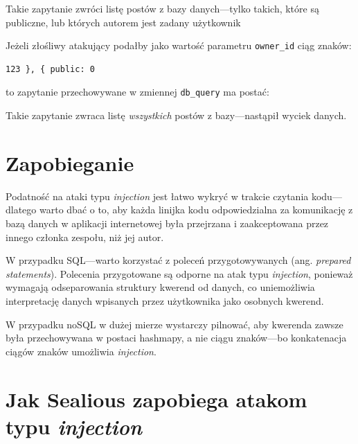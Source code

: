 \documentclass[12pt,polish,a4paper,]{report}
\newenvironment{Shaded}{}{}
\newcommand{\DataTypeTok}[1]{\textcolor[rgb]{0.56,0.13,0.00}{{#1}}}
\newcommand{\DecValTok}[1]{\textcolor[rgb]{0.25,0.63,0.44}{{#1}}}
\newcommand{\OtherTok}[1]{\textcolor[rgb]{0.00,0.44,0.13}{{#1}}}
\newcommand{\FunctionTok}[1]{\textcolor[rgb]{0.02,0.16,0.49}{{#1}}}
\begin{document}
Takie zapytanie zwróci listę postów z bazy danych---tylko takich, które
są publiczne, lub których autorem jest zadany użytkownik

Jeżeli złośliwy atakujący podałby jako wartość parametru
\texttt{owner\_id} ciąg znaków:

\begin{verbatim}
123 }, { public: 0
\end{verbatim}

to zapytanie przechowywane w zmiennej \texttt{db\_query} ma postać:

\begin{Shaded}
\end{Shaded}

Takie zapytanie zwraca listę \emph{wszystkich} postów z bazy---nastąpił
wyciek danych.

\section{Zapobieganie}\label{zapobieganie}

Podatność na ataki typu \emph{injection} jest łatwo wykryć w trakcie
czytania kodu---dlatego warto dbać o to, aby każda linijka kodu
odpowiedzialna za komunikację z bazą danych w aplikacji internetowej
była przejrzana i zaakceptowana przez innego członka zespołu, niż jej
autor.

W przypadku SQL---warto korzystać z poleceń przygotowywanych (ang.
\emph{prepared statements}). Polecenia przygotowane są odporne na atak
typu \emph{injection}, ponieważ wymagają odseparowania struktury kwerend
od danych, co uniemożliwia interpretację danych wpisanych przez
użytkownika jako osobnych kwerend.

W przypadku noSQL w dużej mierze wystarczy pilnować, aby kwerenda zawsze
była przechowywana w postaci hashmapy, a nie ciągu znaków---bo
konkatenacja ciągów znaków umożliwia \emph{injection}.

\section{\texorpdfstring{Jak Sealious zapobiega atakom typu
\emph{injection}}{Jak Sealious zapobiega atakom typu injection}}\label{jak-sealious-zapobiega-atakom-typu-injection}
\end{document}
